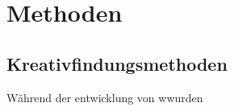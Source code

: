
\section{Methoden}\label{sec:methoden}

\renewcommand{\kapitelautor}{Autor: Philip Jankovic}

%

\subsection{Kreativfindungsmethoden}\label{subsec:kreativfindungsmethoden}

Während der entwicklung von \FF wwurden





%

\renewcommand{\kapitelautor}{}
